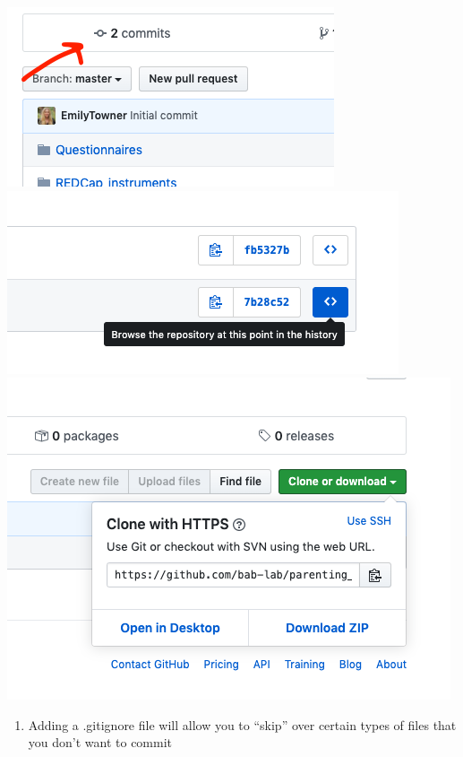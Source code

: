 \documentclass[]{book}
\providecommand{\tightlist}{%
  \setlength{\itemsep}{0pt}\setlength{\parskip}{0pt}}
\begin{document}
\includegraphics{images/research_protocols/github/15.png}
\includegraphics{images/research_protocols/github/16.png}
\includegraphics{images/research_protocols/github/17.png}

\begin{enumerate}
\def\labelenumi{\arabic{enumi}.}
\setcounter{enumi}{10}
\tightlist
\item
  Adding a .gitignore file will allow you to ``skip'' over certain types
  of files that you don't want to commit
\end{enumerate}
\end{document}
